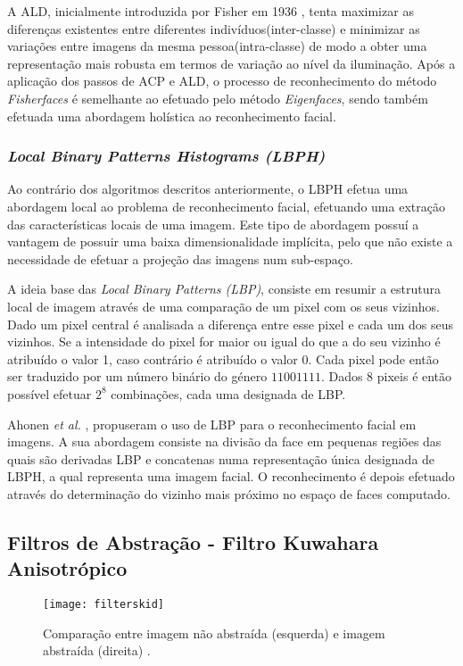 A ALD, inicialmente introduzida por Fisher em 1936 \cite{FISHER1936}, tenta maximizar as diferenças existentes entre diferentes indivíduos(inter-classe) e minimizar as variações entre imagens da mesma pessoa(intra-classe) de modo a obter uma representação mais robusta em termos de variação ao nível da iluminação. Após a aplicação dos passos de ACP e ALD, o processo de reconhecimento do método \textit{Fisherfaces} é semelhante ao efetuado pelo método \textit{Eigenfaces}, sendo também efetuada uma abordagem holística ao reconhecimento facial.


\subsubsection*	{\textit{Local Binary Patterns Histograms (LBPH)}}
Ao contrário dos algoritmos descritos anteriormente, o LBPH efetua uma abordagem local ao problema de reconhecimento facial, efetuando uma extração das características locais de uma imagem. Este tipo de abordagem possuí a vantagem de possuir uma baixa dimensionalidade implícita, pelo que não existe a necessidade de efetuar a projeção das imagens num sub-espaço.

A ideia base das \textit{Local Binary Patterns (LBP)}, consiste em resumir a estrutura local de imagem através de uma comparação de um pixel com os seus vizinhos. Dado um pixel central é analisada a diferença entre esse pixel e cada um dos seus vizinhos. Se a intensidade do pixel for maior ou igual do que a do seu vizinho é atribuído o valor 1, caso contrário é atribuído o valor 0. Cada pixel pode então ser traduzido por um número binário do género $11001111$. Dados $8$ pixeis é então possível efetuar $2^8$ combinações, cada uma designada de LBP.

Ahonen \textit{et al.} \cite{ahonen2004face}, propuseram o uso de LBP para o reconhecimento facial em imagens. A sua abordagem consiste na divisão da face em pequenas regiões das quais são derivadas LBP e concatenas numa representação única designada de LBPH, a qual representa uma imagem facial. O reconhecimento é depois efetuado através do determinação do vizinho mais próximo no espaço de faces computado.

\subsection{Filtros de Abstração - Filtro Kuwahara Anisotrópico}
\begin{figure}[ht]
  \begin{center}
    \leavevmode
    \texttt{[image: filterskid]}
    \caption{Comparação entre imagem não abstraída (esquerda) e imagem abstraída (direita) \cite{Kyprianidis2009}.}	
    \label{fig:filterskid}
  \end{center}
\end{figure}

